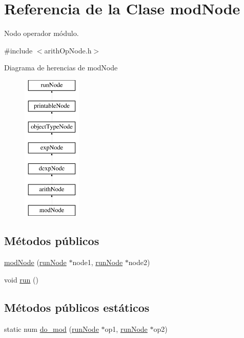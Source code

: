\hypertarget{classmodNode}{\section{Referencia de la Clase mod\-Node}
\label{classmodNode}
}


Nodo operador módulo.  




{\ttfamily \#include $<$arith\-Op\-Node.\-h$>$}

Diagrama de herencias de mod\-Node\begin{figure}[H]
\begin{center}
\leavevmode
\includegraphics[height=7.000000cm]{classmodNode}
\end{center}
\end{figure}
\subsection*{Métodos públicos}
\begin{DoxyCompactItemize}
\item 
\hyperlink{classmodNode_a6144ce3aa3d7532d20bd6054ce41bed2}{mod\-Node} (\hyperlink{classrunNode}{run\-Node} $\ast$node1, \hyperlink{classrunNode}{run\-Node} $\ast$node2)
\item 
void \hyperlink{classmodNode_a0cebb0d5dcfd939c63be542ff45f2be8}{run} ()
\end{DoxyCompactItemize}
\subsection*{Métodos públicos estáticos}
\begin{DoxyCompactItemize}
\item 
static num \hyperlink{classmodNode_ae2e462dbe58c905df80ca78c7663da31}{do\-\_\-mod} (\hyperlink{classrunNode}{run\-Node} $\ast$op1, \hyperlink{classrunNode}{run\-Node} $\ast$op2)
\end{DoxyCompactItemize}
